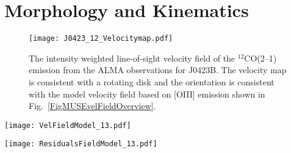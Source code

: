 \documentclass[a4paper,fleqn,usenatbib]{mnras}
\newcommand{\GalB}{J0423B}
\begin{document}
{\section{Morphology and Kinematics}

\begin{figure}
\texttt{[image: J0423\_12\_Velocitymap.pdf]}
\caption{The intensity weighted line-of-sight velocity field of the $^{12}$CO(2--1) emission from the ALMA observations for \GalB. The velocity map is consistent with a rotating disk and the orientation is consistent with the model velocity field based on [OIII] emission shown in Fig.~\ref{FigMUSEvelFieldOverview}.}
\label{FigCO2--1VelMap}
\end{figure}

\begin{figure*}
\centering
\begin{minipage}{0.40\linewidth}
\centering
{}
\end{minipage}
\begin{minipage}{0.25\linewidth}
\centering
\texttt{[image: VelFieldModel\_13.pdf]}
\end{minipage}
\begin{minipage}{0.25\linewidth}
\centering
\texttt{[image: ResidualsFieldModel\_13.pdf]}
\end{minipage}\\
\begin{minipage}{0.40\linewidth}
\centering
{}
\end{minipage}
\end{figure*}}
\end{document}

